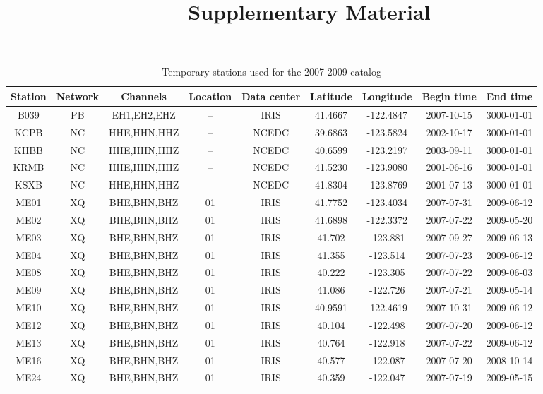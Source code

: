 \documentclass{article}
\begin{document}
\title{Supplementary Material}
\date{}
\maketitle

\begin{table}
\caption{Temporary stations used for the 2007-2009 catalog}
\centering
\begin{tabular}{c c c c c c c c c}
\hline
Station & Network & Channels & Location & Data center & Latitude & Longitude & Begin time & End time \\
\hline
B039 & PB & EH1,EH2,EHZ & -- & IRIS & 41.4667 & -122.4847 & 2007-10-15 & 3000-01-01 \\
KCPB & NC & HHE,HHN,HHZ & -- & NCEDC & 39.6863 & -123.5824 & 2002-10-17 & 3000-01-01 \\
KHBB & NC & HHE,HHN,HHZ & -- & NCEDC & 40.6599 & -123.2197 & 2003-09-11 & 3000-01-01 \\
KRMB & NC & HHE,HHN,HHZ & -- & NCEDC & 41.5230 & -123.9080 & 2001-06-16 & 3000-01-01 \\
KSXB & NC & HHE,HHN,HHZ & -- & NCEDC & 41.8304 & -123.8769 & 2001-07-13 & 3000-01-01 \\
ME01 & XQ & BHE,BHN,BHZ & 01 & IRIS & 41.7752 & -123.4034 & 2007-07-31 & 2009-06-12 \\
ME02 & XQ & BHE,BHN,BHZ & 01 & IRIS & 41.6898 & -122.3372 & 2007-07-22 & 2009-05-20 \\
ME03 & XQ & BHE,BHN,BHZ & 01 & IRIS & 41.702 & -123.881 & 2007-09-27 & 2009-06-13 \\
ME04 & XQ & BHE,BHN,BHZ & 01 & IRIS & 41.355 & -123.514 & 2007-07-23 & 2009-06-12 \\
ME08 & XQ & BHE,BHN,BHZ & 01 & IRIS & 40.222 & -123.305 & 2007-07-22 & 2009-06-03 \\
ME09 & XQ & BHE,BHN,BHZ & 01 & IRIS & 41.086 & -122.726 & 2007-07-21 & 2009-05-14 \\
ME10 & XQ & BHE,BHN,BHZ & 01 & IRIS & 40.9591 & -122.4619 & 2007-10-31 & 2009-06-12 \\
ME12 & XQ & BHE,BHN,BHZ & 01 & IRIS & 40.104 & -122.498 & 2007-07-20 & 2009-06-12 \\
ME13 & XQ & BHE,BHN,BHZ & 01 & IRIS & 40.764 & -122.918 & 2007-07-22 & 2009-06-12 \\
ME16 & XQ & BHE,BHN,BHZ & 01 & IRIS & 40.577 &  -122.087 & 2007-07-20 & 2008-10-14 \\
ME24 & XQ & BHE,BHN,BHZ & 01 & IRIS & 40.359 & -122.047 & 2007-07-19 & 2009-05-15 \\

\end{tabular}
\end{table}
\end{document}
